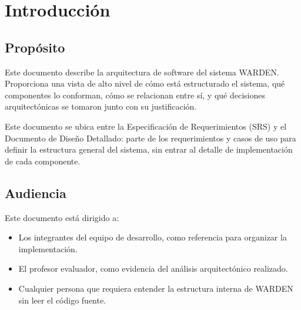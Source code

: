 \documentclass[11pt,a4paper]{article}
\begin{document}

\begin{wardenrevisions}
\end{wardenrevisions}

\tableofcontents
\newpage

\section{Introducción}

\subsection{Propósito}
Este documento describe la arquitectura de software del sistema WARDEN.
Proporciona una vista de alto nivel de cómo está estructurado el sistema,
qué componentes lo conforman, cómo se relacionan entre sí, y qué
decisiones arquitectónicas se tomaron junto con su justificación.

Este documento se ubica entre la Especificación de Requerimientos (SRS) y
el Documento de Diseño Detallado: parte de los requerimientos y casos de
uso para definir la estructura general del sistema, sin entrar al detalle
de implementación de cada componente.

\subsection{Audiencia}
Este documento está dirigido a:

\begin{itemize}
  \item Los integrantes del equipo de desarrollo, como referencia para
    organizar la implementación.
  \item El profesor evaluador, como evidencia del análisis arquitectónico
    realizado.
  \item Cualquier persona que requiera entender la estructura interna de
    WARDEN sin leer el código fuente.
\end{itemize}
\end{document}
